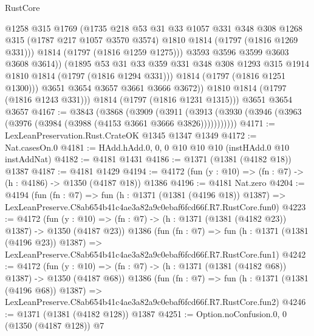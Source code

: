 \begin{lexlean}{RustCore}
\begin{coremodule}
                    @1258
                    @315
                    @1769
                    (@1735
                      @218
                      @53
                      @31
                      @33
                      @1057
                      @331
                      @348
                      @308
                      @1268
                      @315
                      (@1787 @217 @1057 @3570 @3574)
                      @1810
                      @1814
                      (@1797 (@1816 @1269 @331)))
                    @1814
                    (@1797 (@1816 @1259 @1275)))
                  @3593
                  @3596
                  @3599
                  @3603
                  @3608
                  @3614))
              (@1895
                @53
                @31
                @33
                @359
                @331
                @348
                @308
                @1293
                @315
                @1914
                @1810
                @1814
                (@1797 (@1816 @1294 @331)))
              @1814
              (@1797 (@1816 @1251 @1300)))
            @3651
            @3654
            @3657
            @3661
            @3666
            @3672))
        @1810
        @1814
        (@1797 (@1816 @1243 @331)))
      @1814
      (@1797 (@1816 @1231 @1315)))
    @3651
    @3654
    @3657
@4167 := @3843
    (@3868
      (@3909
        (@3911 (@3913 (@3930 (@3946 (@3963 (@3976 (@3984 (@3988 (@4153 @3661 @3666 @3826)))))))))))
@4171 := LexLeanPreservation.Rust.CrateOK @1345 @1347 @1349
@4172 := Nat.casesOn.{0}
@4181 := HAdd.hAdd.{0, 0, 0} @10 @10 @10 (instHAdd.{0} @10 instAddNat)
@4182 := @4181 @1431
@4186 := @1371 (@1381 (@4182 @18)) @1387
@4187 := @4181 @1429
@4194 := @4172 (fun (y : @10) => (fn : @7) -> (h : @4186) -> @1350 (@4187 @18)) @1386
@4196 := @4181 Nat.zero
@4204 := @4194
    (fun (fn : @7) =>
    fun (h : @1371 (@1381 (@4196 @18)) @1387) =>
    LexLeanPreserve.C8ab654b41c4ae3a82a9c0ebaf6fcd66f.R7.RustCore.fun0)
@4223 := @4172
    (fun (y : @10) => (fn : @7) -> (h : @1371 (@1381 (@4182 @23)) @1387) -> @1350 (@4187 @23))
    @1386
    (fun (fn : @7) =>
    fun (h : @1371 (@1381 (@4196 @23)) @1387) =>
    LexLeanPreserve.C8ab654b41c4ae3a82a9c0ebaf6fcd66f.R7.RustCore.fun1)
@4242 := @4172
    (fun (y : @10) => (fn : @7) -> (h : @1371 (@1381 (@4182 @68)) @1387) -> @1350 (@4187 @68))
    @1386
    (fun (fn : @7) =>
    fun (h : @1371 (@1381 (@4196 @68)) @1387) =>
    LexLeanPreserve.C8ab654b41c4ae3a82a9c0ebaf6fcd66f.R7.RustCore.fun2)
@4246 := @1371 (@1381 (@4182 @128)) @1387
@4251 := Option.noConfusion.{0, 0} (@1350 (@4187 @128)) @7

\end{coremodule}
\end{lexlean}
